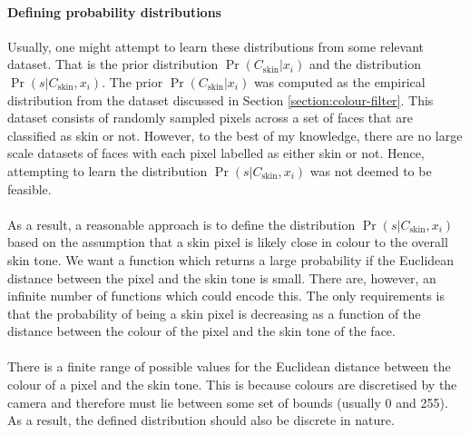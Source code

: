 \paragraph{Defining probability distributions}
Usually, one might attempt to learn these distributions from some relevant dataset. That is the prior distribution $\Pr(C_\mathrm{skin}|x_i)$ and the distribution $\Pr(s|C_\mathrm{skin}, x_i)$.
The prior $\Pr(C_\mathrm{skin}|x_i)$ was computed as the empirical distribution from 
the dataset discussed in Section \ref{section:colour-filter}. This dataset consists of randomly sampled pixels across a set of faces that are classified as skin or not.
However, to the best of my knowledge, there are no large scale datasets of faces with each pixel labelled as either skin or not. Hence, attempting to learn the distribution $\Pr(s|C_\mathrm{skin}, x_i)$ was not deemed to be feasible.
\\\\
As a result, a reasonable approach is to define the distribution $\Pr(s|C_\mathrm{skin}, x_i)$ based on the assumption that a skin pixel is likely close in colour to the overall skin tone. We want a function which returns a large probability if the Euclidean distance between the pixel and the skin tone is small.
There are, however, an infinite number of functions which could encode this. The only requirements is that the probability of being a skin pixel is  decreasing as a function of the distance between the colour of the pixel and the skin tone of the face. 
\\\\
There is a finite range of possible values for the Euclidean distance between the colour of a pixel and the skin tone. This is because colours are discretised by the camera and therefore must lie between some set of bounds (usually 0 and 255). As a result, the defined distribution should also be discrete in nature.
\\\\ 

 





